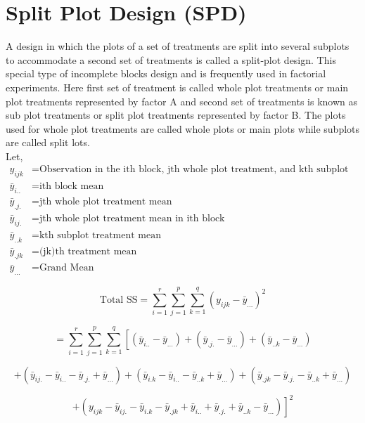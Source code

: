 \documentclass[oneside,12pt,fleqn]{book}
\begin{document}
\section{Split Plot Design (SPD)}
A design in which the plots of a set of treatments are split into several subplots to accommodate a second 
set of treatments is called a split-plot design. This special type of incomplete blocks design and is frequently 
used in factorial experiments. Here first set of treatment is called whole plot treatments or main plot 
treatments represented by factor A and second set of treatments is known as sub plot treatments or split plot 
treatments represented by factor B. The plots used for whole plot treatments are called whole plots or main 
plots while subplots are called split lots. \\
Let,
\begin{align*}
y_{ijk} & = \text{Observation in the ith block, jth whole plot treatment, and kth subplot treatments} \\
\bar{y}_{i..} & = \text{ith block mean} \\
\bar{y}_{.j.} & = \text{jth whole plot treatment mean} \\
\bar{y}_{ij.} & = \text{jth whole plot treatment mean in ith block} \\
\bar{y}_{..k} & = \text{kth subplot treatment mean} \\
\bar{y}_{.jk} & = \text{(jk)th treatment mean} \\
\bar{y}_{...} & = \text{Grand Mean}
\end{align*}

\[
\text{Total SS} = \sum_{i=1}^{r} \sum_{j=1}^{p} \sum_{k=1}^{q} (y_{ijk} - \bar{y}_{...})^2
\]

\[
= \sum_{i=1}^{r} \sum_{j=1}^{p} \sum_{k=1}^{q} \left[ (\bar{y}_{i..} - \bar{y}_{...}) + (\bar{y}_{.j.} - \bar{y}_{...}) + (\bar{y}_{..k} - \bar{y}_{...}) \right.
\]


\[
\left. + (\bar{y}_{ij.} - \bar{y}_{i..} - \bar{y}_{.j.} + \bar{y}_{...}) + (\bar{y}_{i.k} - \bar{y}_{i..} - \bar{y}_{..k} + \bar{y}_{...}) + (\bar{y}_{.jk} - \bar{y}_{.j.} - \bar{y}_{..k} + \bar{y}_{...}) \right.
\]

\[
\left. + (y_{ijk} - \bar{y}_{ij.} - \bar{y}_{i.k} - \bar{y}_{.jk} + \bar{y}_{i..} + \bar{y}_{.j.} + \bar{y}_{..k} - \bar{y}_{...}) \right]^2
\]

\end{document}
